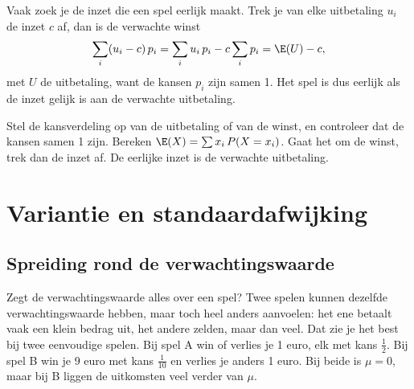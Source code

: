Vaak zoek je de inzet die een spel eerlijk maakt. Trek je van elke uitbetaling $u_i$ de inzet $c$ af, dan is de verwachte winst
\[\sum_i (u_i - c)\, p_i = \sum_i u_i\, p_i - c \sum_i p_i = \E(U) - c ,\]
met $U$ de uitbetaling, want de kansen $p_i$ zijn samen 1. Het spel is dus eerlijk als de inzet gelijk is aan de verwachte uitbetaling.


\begin{werkwijze}
Stel de kansverdeling op van de uitbetaling of van de winst, en controleer dat de kansen samen 1 zijn. Bereken $\E(X) = \sum x_i \, P(X = x_i)$. Gaat het om de winst, trek dan de inzet af. De eerlijke inzet is de verwachte uitbetaling.
\end{werkwijze}

\begin{oefeningen}
\end{oefeningen}

\section{Variantie en standaardafwijking}

\subsection{Spreiding rond de verwachtingswaarde}

Zegt de verwachtingswaarde alles over een spel? Twee spelen kunnen dezelfde verwachtingswaarde hebben, maar toch heel anders aanvoelen: het ene betaalt vaak een klein bedrag uit, het andere zelden, maar dan veel. Dat zie je het best bij twee eenvoudige spelen. Bij spel A win of verlies je 1 euro, elk met kans $\frac12$. Bij spel B win je 9 euro met kans $\frac{1}{10}$ en verlies je anders 1 euro. Bij beide is $\mu = 0$, maar bij B liggen de uitkomsten veel verder van $\mu$.

